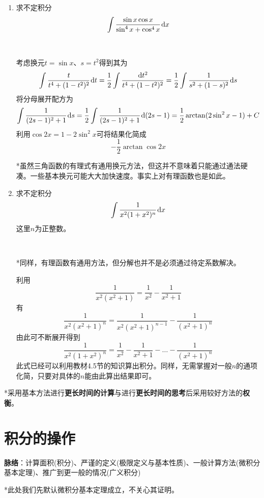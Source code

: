 \documentclass[a4paper,UTF8,fontset=windows]{ctexart}
\newcommand*{\dr}{\hspace{0.07em}\mathrm{d}}
\begin{document}
\begin{enumerate}
    \item 求不定积分
    $$\int\frac{\sin x\cos x}{\sin^4x+\cos^4x}\dr x$$

    \

    考虑换元$t=\sin x$、$s=t^2$得到其为
    $$\int\frac{t}{t^4+(1-t^2)^2}\dr t=\frac{1}{2}\int\frac{\dr t^2}{t^4+(1-t^2)^2}=\frac{1}{2}\int\frac{1}{s^2+(1-s)^2}\dr s$$
    将分母展开配方为
    $$\int\frac{1}{(2s-1)^2+1}\dr s=\frac{1}{2}\int\frac{1}{(2s-1)^2+1}\dr(2s-1)=\frac{1}{2}\arctan(2\sin^2x-1)+C$$
    利用$\cos2x=1-2\sin^2x$可将结果化简成
    $$-\frac{1}{2}\arctan\cos2x$$

    *虽然三角函数的有理式有通用换元方法，但这并不意味着只能通过通法硬凑。一些基本换元可能大大加快速度。事实上对有理函数也是如此。

    \item 求不定积分
    $$\int\frac{1}{x^2(1+x^2)^n}\dr x$$
    这里$n$为正整数。
    
    \
    
    *同样，有理函数有通用方法，但分解也并不是必须通过待定系数解决。
    
    利用
    $$\frac{1}{x^2(x^2+1)}=\frac{1}{x^2}-\frac{1}{x^2+1}$$
    有
    $$\frac{1}{x^2(x^2+1)^n}=\frac{1}{x^2(x^2+1)^{n-1}}-\frac{1}{(x^2+1)^n}$$
    由此可不断展开得到
    $$\frac{1}{x^2(1+x^2)^n}=\frac{1}{x^2}-\frac{1}{x^2+1}-\dots-\frac{1}{(x^2+1)^n}$$
    此式已经可以利用教材4.5节的知识算出积分。同样，无需掌握对一般$n$的通项化简，只要对具体的$n$能由此算出结果即可。
\end{enumerate}

*采用基本方法进行\textbf{更长时间的计算}与进行\textbf{更长时间的思考}后采用较好方法的\textbf{权衡}。

\section{积分的操作}
\textbf{脉络}：计算面积(积分)、严谨的定义(极限定义与基本性质)、一般计算方法(微积分基本定理)、推广到更一般的情况(广义积分)

*此处我们先默认微积分基本定理成立，不关心其证明。
\end{document}
